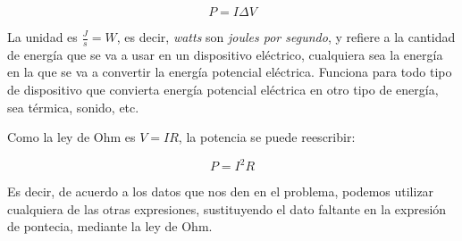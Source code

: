 \begin{equation*}
    P=I\Delta V
\end{equation*}

La unidad es \(\frac{J}{s} = W\), es decir,
\textit{watts} son \textit{joules por segundo},
y refiere a la cantidad de energía que se va a usar en un dispositivo eléctrico,
cualquiera sea la energía en la que se va a convertir la energía potencial 
eléctrica.
Funciona para todo tipo de dispositivo que convierta energía potencial 
eléctrica en otro tipo de energía,
sea térmica, sonido, etc.

Como la ley de Ohm es \(V=IR\),
la potencia se puede reescribir:

\begin{equation*}
    P=I^{2}R
\end{equation*}

Es decir,
de acuerdo a los datos que nos den en el problema,
podemos utilizar cualquiera de las otras expresiones,
sustituyendo el dato faltante en la expresión de pontecia,
mediante la ley de Ohm.